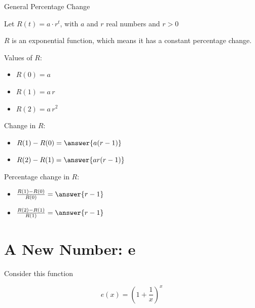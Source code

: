 \documentclass{ximera}
\begin{document}
\begin{example} General Percentage Change



Let $R(t) = a \cdot r^t$, with $a$ and $r$ real numbers and $r>0$ 

$R$ is an exponential function, which means it has a constant percentage change. 

Values of $R$:

\begin{itemize}
\item $R(0) = a$

\item $R(1) = a \, r$

\item $R(2) = a \, r^2$
\end{itemize}



Change in $R$:

\begin{itemize}
\item $R(1) - R(0) = \answer{a (r-1)}$

\item $R(2) - R(1) = \answer{a r (r-1)}$

\end{itemize}





Percentage change in $R$:

\begin{itemize}
\item $\frac{R(1) - R(0)}{R(0)} = \answer{r-1}$

\item $\frac{R(2) - R(1)}{R(1)} = \answer{r-1}$

\end{itemize}


\end{example}














\section*{A New Number: e}


Consider this function 


\[
e(x) = \left(1 + \frac{1}{x}\right)^x
\]
\end{document}
